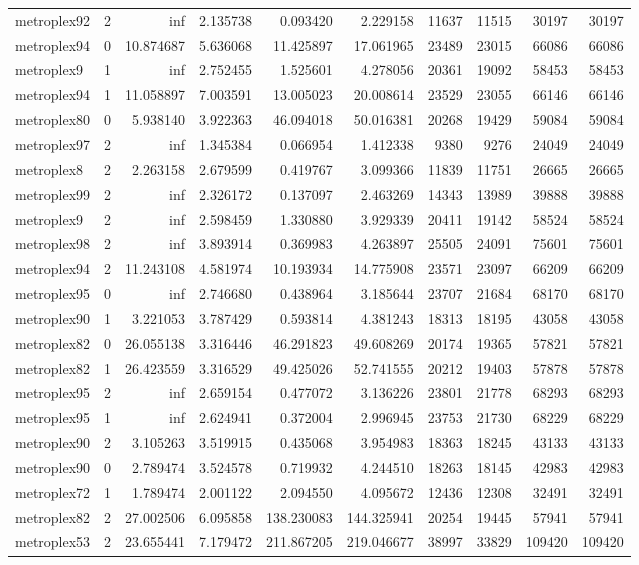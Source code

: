 \begin{longtable}{|l|r|r|r|r|r|r|r|r|r|}
metroplex92 & 2 & inf & 2.135738 & 0.093420 & 2.229158 & 11637 & 11515 & 30197 & 30197 \\
metroplex94 & 0 & 10.874687 & 5.636068 & 11.425897 & 17.061965 & 23489 & 23015 & 66086 & 66086 \\
metroplex9 & 1 & inf & 2.752455 & 1.525601 & 4.278056 & 20361 & 19092 & 58453 & 58453 \\
metroplex94 & 1 & 11.058897 & 7.003591 & 13.005023 & 20.008614 & 23529 & 23055 & 66146 & 66146 \\
metroplex80 & 0 & 5.938140 & 3.922363 & 46.094018 & 50.016381 & 20268 & 19429 & 59084 & 59084 \\
metroplex97 & 2 & inf & 1.345384 & 0.066954 & 1.412338 & 9380 & 9276 & 24049 & 24049 \\
metroplex8 & 2 & 2.263158 & 2.679599 & 0.419767 & 3.099366 & 11839 & 11751 & 26665 & 26665 \\
metroplex99 & 2 & inf & 2.326172 & 0.137097 & 2.463269 & 14343 & 13989 & 39888 & 39888 \\
metroplex9 & 2 & inf & 2.598459 & 1.330880 & 3.929339 & 20411 & 19142 & 58524 & 58524 \\
metroplex98 & 2 & inf & 3.893914 & 0.369983 & 4.263897 & 25505 & 24091 & 75601 & 75601 \\
metroplex94 & 2 & 11.243108 & 4.581974 & 10.193934 & 14.775908 & 23571 & 23097 & 66209 & 66209 \\
metroplex95 & 0 & inf & 2.746680 & 0.438964 & 3.185644 & 23707 & 21684 & 68170 & 68170 \\
metroplex90 & 1 & 3.221053 & 3.787429 & 0.593814 & 4.381243 & 18313 & 18195 & 43058 & 43058 \\
metroplex82 & 0 & 26.055138 & 3.316446 & 46.291823 & 49.608269 & 20174 & 19365 & 57821 & 57821 \\
metroplex82 & 1 & 26.423559 & 3.316529 & 49.425026 & 52.741555 & 20212 & 19403 & 57878 & 57878 \\
metroplex95 & 2 & inf & 2.659154 & 0.477072 & 3.136226 & 23801 & 21778 & 68293 & 68293 \\
metroplex95 & 1 & inf & 2.624941 & 0.372004 & 2.996945 & 23753 & 21730 & 68229 & 68229 \\
metroplex90 & 2 & 3.105263 & 3.519915 & 0.435068 & 3.954983 & 18363 & 18245 & 43133 & 43133 \\
metroplex90 & 0 & 2.789474 & 3.524578 & 0.719932 & 4.244510 & 18263 & 18145 & 42983 & 42983 \\
metroplex72 & 1 & 1.789474 & 2.001122 & 2.094550 & 4.095672 & 12436 & 12308 & 32491 & 32491 \\
metroplex82 & 2 & 27.002506 & 6.095858 & 138.230083 & 144.325941 & 20254 & 19445 & 57941 & 57941 \\
metroplex53 & 2 & 23.655441 & 7.179472 & 211.867205 & 219.046677 & 38997 & 33829 & 109420 & 109420 \\
\end{longtable}

